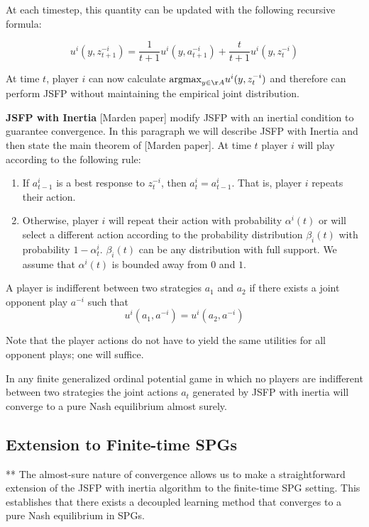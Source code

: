 At each timestep, this quantity can be updated with the following recursive formula:

$$
u^i(y, z^{-i}_{t+1}) = \frac{1}{t+1} u^i(y, a^{-i}_{t+1}) + \frac{t}{t+1} u^i(y, z^{-i}_t)
$$

At time $t$, player $i$ can now calculate $\text{argmax}_{y \in \AA} u^i(y, z^{-i}_t)$ and therefore can perform JSFP without maintaining the empirical joint distribution.


{\bf JSFP with Inertia} [Marden paper] modify JSFP with an inertial condition to guarantee convergence. In this paragraph we will describe JSFP with Inertia and then state the main theorem of [Marden paper]. At time $t$ player $i$ will play according to the following rule:
\begin{enumerate}
\item If $a_{t-1}^i$ is a best response to $z^{-i}_t$, then $a_t^i = a_{t-1}^i$. That is, player $i$ repeats their action.
\item Otherwise, player $i$ will repeat their action with probability $\alpha^i(t)$ or will select a different action according to the probability distribution $\beta_i(t)$ with probability $1-\alpha^i_t$. $\beta_i(t)$ can be any distribution with full support. We assume that $\alpha^i(t)$ is bounded away from $0$ and $1$.
\end{enumerate}

\begin{mydef}
A player is indifferent between two strategies $a_1$ and $a_2$ if there exists a joint opponent play $a^{-i}$ such that
$$
u^i(a_1, a^{-i}) = u^i(a_2, a^{-i})
$$

Note that the player actions do not have to yield the same utilities for all opponent plays; one will suffice.
\end{mydef}


\begin{thm}[Marden]
In any finite generalized ordinal potential game in which no players are indifferent between two strategies the joint actions $a_t$ generated by JSFP with inertia will converge to a pure Nash equilibrium almost surely.
\end{thm}


\subsection{Extension to Finite-time SPGs}


**
The almost-sure nature of convergence allows us to make a straightforward extension of the JSFP with inertia algorithm to the finite-time SPG setting. This establishes that there exists a decoupled learning method that converges to a pure Nash equilibrium in SPGs.

